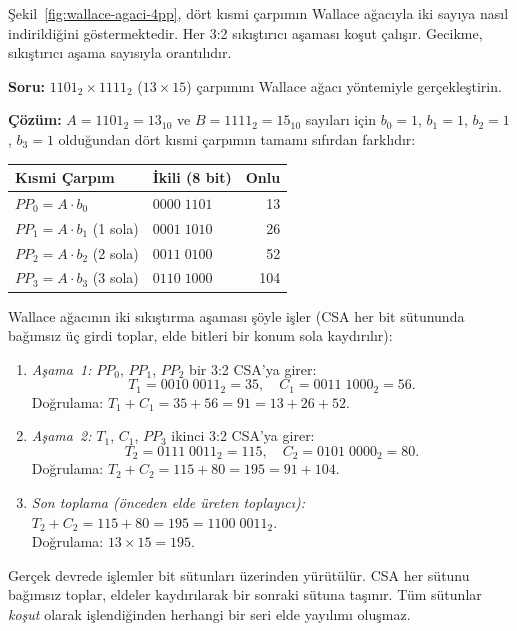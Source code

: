 Şekil~\ref{fig:wallace-agaci-4pp}, dört kısmi çarpımın Wallace ağacıyla iki sayıya nasıl indirildiğini göstermektedir. Her 3:2 sıkıştırıcı aşaması koşut çalışır. Gecikme, sıkıştırıcı aşama sayısıyla orantılıdır.

\begin{ornek}[5.9]
\textbf{Soru:} $1101_2 \times 1111_2$ ($13 \times 15$) çarpımını Wallace ağacı yöntemiyle gerçekleştirin.

\textbf{Çözüm:} $A = 1101_2 = 13_{10}$ ve $B = 1111_2 = 15_{10}$ sayıları için $b_0{=}1$, $b_1{=}1$, $b_2{=}1$, $b_3{=}1$ olduğundan dört kısmi çarpımın tamamı sıfırdan farklıdır:

\begin{center}
\begin{tabular}{l l r}
\toprule
\textbf{Kısmi Çarpım} & \textbf{İkili (8 bit)} & \textbf{Onlu} \\
\midrule
$PP_0 = A \cdot b_0$           & $0000\;1101$ & 13  \\
$PP_1 = A \cdot b_1$ (1 sola)  & $0001\;1010$ & 26  \\
$PP_2 = A \cdot b_2$ (2 sola)  & $0011\;0100$ & 52  \\
$PP_3 = A \cdot b_3$ (3 sola)  & $0110\;1000$ & 104 \\
\bottomrule
\end{tabular}
\end{center}

Wallace ağacının iki sıkıştırma aşaması şöyle işler (CSA her bit sütununda bağımsız üç girdi toplar, elde bitleri bir konum sola kaydırılır):

\begin{enumerate}[nosep]
    \item \textit{Aşama~1:} $PP_0$, $PP_1$, $PP_2$ bir 3:2 CSA'ya girer:
        \[ T_1 = 0010\;0011_2 = 35, \quad C_1 = 0011\;1000_2 = 56. \]
        Doğrulama: $T_1 + C_1 = 35 + 56 = 91 = 13 + 26 + 52$. \checkmark
    \item \textit{Aşama~2:} $T_1$, $C_1$, $PP_3$ ikinci 3:2 CSA'ya girer:
        \[ T_2 = 0111\;0011_2 = 115, \quad C_2 = 0101\;0000_2 = 80. \]
        Doğrulama: $T_2 + C_2 = 115 + 80 = 195 = 91 + 104$. \checkmark
    \item \textit{Son toplama (önceden elde üreten toplayıcı):} $T_2 + C_2 = 115 + 80 = 195 = 1100\;0011_2$. \\
        Doğrulama: $13 \times 15 = 195$. \checkmark
\end{enumerate}

Gerçek devrede işlemler bit sütunları üzerinden yürütülür. CSA her sütunu bağımsız toplar, eldeler kaydırılarak bir sonraki sütuna taşınır. Tüm sütunlar \emph{koşut} olarak işlendiğinden herhangi bir seri elde yayılımı oluşmaz.
\end{ornek}

